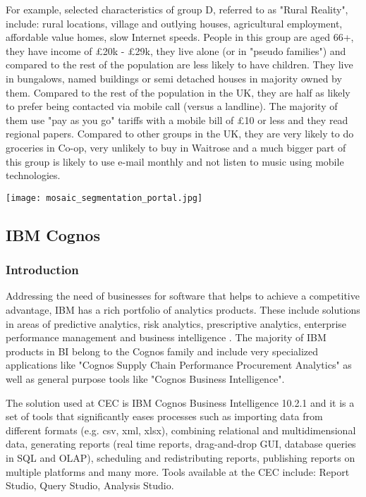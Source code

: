 For example, selected characteristics of group D, referred to as "Rural Reality", include: rural locations, village and outlying houses, agricultural employment, affordable value homes, slow Internet speeds. People in this group are aged 66+, they have income of \pounds 20k - \pounds 29k, they live alone (or in "pseudo families") and compared to the rest of the population are less likely to have children. They live in bungalows, named buildings or semi detached houses in majority owned by them. Compared to the rest of the population in the UK, they are half as likely to prefer being contacted via  mobile call (versus a landline). The majority of them use "pay as you go" tariffs with a mobile bill of \pounds 10 or less and they read regional papers. Compared to other groups in the UK, they are very likely to do groceries in Co-op, very unlikely to buy in Waitrose and a much bigger part of this group is likely to use e-mail monthly and not listen to music using mobile technologies. 

\begin{center}
  \texttt{[image: mosaic\_segmentation\_portal.jpg]}
\end{center}


		\subsection{IBM Cognos}
		
			\subsubsection{Introduction}
			
Addressing the need of businesses for software that helps to achieve a competitive advantage, IBM has a rich portfolio of analytics products. These include solutions in areas of predictive analytics, risk analytics, prescriptive analytics, enterprise performance management and business intelligence \citep{IBM2015b}. The majority of IBM products in BI belong to the Cognos family and include very specialized applications like "Cognos Supply Chain Performance Procurement Analytics" as well as general purpose tools like "Cognos Business Intelligence".

The solution used at CEC is IBM Cognos Business Intelligence 10.2.1 and it is a set of tools that significantly eases processes such as importing data from different formats (e.g. csv, xml, xlsx), combining relational and multidimensional data, generating reports (real time reports, drag-and-drop GUI, database queries in SQL and OLAP), scheduling and redistributing reports, publishing reports on multiple platforms and many more. Tools available at the CEC include: Report Studio, Query Studio, Analysis Studio.

